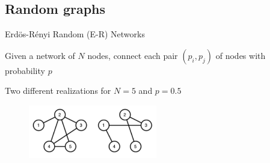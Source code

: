 \subsection{Random graphs}

\begin{frame}{Erd\"{o}s-R\'{e}nyi Random (E-R) Networks}

\begin{definition}
Given a network of $N$ nodes, connect each pair $(p_i,p_j)$ of nodes
with probability $p$
\end{definition}

\bigskip
Two different realizations for $N = 5$ and $p = 0.5$

\begin{figure}
\includegraphics[width=0.5\textwidth]{figs/08/random}
\end{figure}

\end{frame}


